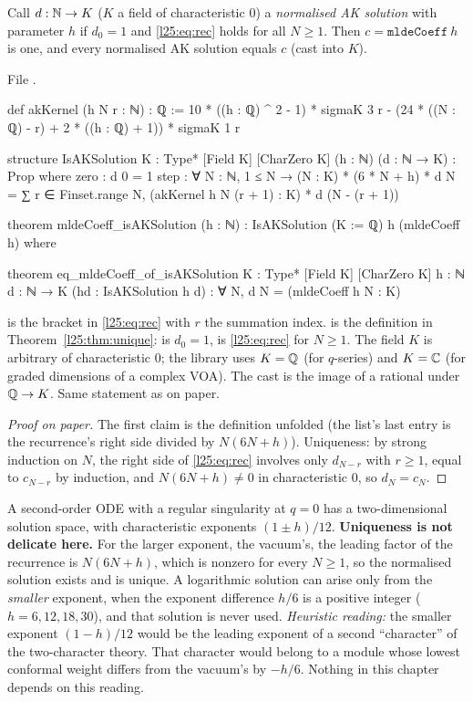 \begin{theorem}\label{l25:thm:unique}
Call $d:{\mathbb{N}}\to K$ ($K$ a field of characteristic $0$) a \emph{normalised AK solution} with parameter $h$ if $d_0=1$
and \eqref{l25:eq:rec} holds for all $N\ge1$. Then $c=\mathtt{mldeCoeff}\ h$ is one, and every normalised AK
solution equals $c$ (cast into $K$).
\end{theorem}
\noindent File .
\begin{leancode}
def akKernel (h N r : ℕ) : ℚ :=
  10 * ((h : ℚ) ^ 2 - 1) * sigmaK 3 r - (24 * ((N : ℚ) - r) + 2 * ((h : ℚ) + 1)) * sigmaK 1 r

structure IsAKSolution {K : Type*} [Field K] [CharZero K] (h : ℕ) (d : ℕ → K) : Prop where
  zero : d 0 = 1
  step : ∀ N : ℕ, 1 ≤ N →
    (N : K) * (6 * N + h) * d N
      = ∑ r ∈ Finset.range N, (akKernel h N (r + 1) : K) * d (N - (r + 1))

theorem mldeCoeff_isAKSolution (h : ℕ) : IsAKSolution (K := ℚ) h (mldeCoeff h) where

theorem eq_mldeCoeff_of_isAKSolution {K : Type*} [Field K] [CharZero K] {h : ℕ} {d : ℕ → K}
    (hd : IsAKSolution h d) : ∀ N, d N = (mldeCoeff h N : K)
\end{leancode}
\begin{dictionary}
 is the bracket in \eqref{l25:eq:rec} with $r$ the summation index.  is the
definition in Theorem~\ref{l25:thm:unique}:  is $d_0=1$,  is \eqref{l25:eq:rec} for $N\ge1$. The
field $K$ is arbitrary of characteristic $0$; the library uses $K={\mathbb{Q}}$ (for $q$-series) and $K={\mathbb{C}}$ (for graded
dimensions of a complex VOA). The cast  is the image of a rational under ${\mathbb{Q}}\to K$.
Same statement as on paper.
\end{dictionary}
\begin{proof}[Proof on paper]
The first claim is the definition unfolded (the list's last entry is the recurrence's right side divided by
$N(6N+h)$). Uniqueness: by strong induction on $N$, the right side of \eqref{l25:eq:rec} involves only $d_{N-r}$ with
$r\ge1$, equal to $c_{N-r}$ by induction, and $N(6N+h)\ne0$ in characteristic $0$, so $d_N=c_N$.
\end{proof}
\begin{physics}
A second-order ODE with a regular singularity at $q=0$ has a two-dimensional solution space, with characteristic
exponents $(1\pm h)/12$. \textbf{Uniqueness is not delicate here.} For the larger exponent, the vacuum's, the leading
factor of the recurrence is $N(6N+h)$, which is nonzero for every $N\ge1$, so the normalised solution exists and is
unique. A logarithmic solution can arise only from the \emph{smaller} exponent, when the exponent difference $h/6$ is a
positive integer ($h=6,12,18,30$), and that solution is never used. \emph{Heuristic reading:} the smaller exponent
$(1-h)/12$ would be the leading exponent of a second ``character'' of the two-character theory. That character would
belong to a module whose lowest conformal weight differs from the vacuum's by $-h/6$. Nothing in this chapter depends on
this reading.
\end{physics}

